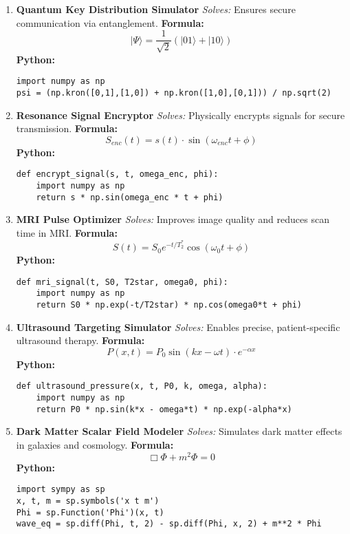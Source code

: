 \documentclass[12pt]{article}
\begin{document}
\begin{enumerate}[leftmargin=0pt, label=\textbf{\arabic*.}, itemsep=3em]
\item \textbf{Quantum Key Distribution Simulator}  
\textit{Solves:} Ensures secure communication via entanglement.  
\textbf{Formula:}  
\[
|\Psi\rangle = \frac{1}{\sqrt{2}}(|01\rangle + |10\rangle)
\]  
\textbf{Python:}
\begin{lstlisting}
import numpy as np
psi = (np.kron([0,1],[1,0]) + np.kron([1,0],[0,1])) / np.sqrt(2)
\end{lstlisting}

\item \textbf{Resonance Signal Encryptor}  
\textit{Solves:} Physically encrypts signals for secure transmission.  
\textbf{Formula:}  
\[
S_{enc}(t) = s(t) \cdot \sin(\omega_{enc} t + \phi)
\]  
\textbf{Python:}
\begin{lstlisting}
def encrypt_signal(s, t, omega_enc, phi):
    import numpy as np
    return s * np.sin(omega_enc * t + phi)
\end{lstlisting}

\item \textbf{MRI Pulse Optimizer}  
\textit{Solves:} Improves image quality and reduces scan time in MRI.  
\textbf{Formula:}  
\[
S(t) = S_0 e^{-t/T_2^*} \cos(\omega_0 t + \phi)
\]  
\textbf{Python:}
\begin{lstlisting}
def mri_signal(t, S0, T2star, omega0, phi):
    import numpy as np
    return S0 * np.exp(-t/T2star) * np.cos(omega0*t + phi)
\end{lstlisting}

\item \textbf{Ultrasound Targeting Simulator}  
\textit{Solves:} Enables precise, patient-specific ultrasound therapy.  
\textbf{Formula:}  
\[
P(x, t) = P_0 \sin(kx - \omega t) \cdot e^{-\alpha x}
\]  
\textbf{Python:}
\begin{lstlisting}
def ultrasound_pressure(x, t, P0, k, omega, alpha):
    import numpy as np
    return P0 * np.sin(k*x - omega*t) * np.exp(-alpha*x)
\end{lstlisting}

\item \textbf{Dark Matter Scalar Field Modeler}  
\textit{Solves:} Simulates dark matter effects in galaxies and cosmology.  
\textbf{Formula:}  
\[
\Box \Phi + m^2 \Phi = 0
\]  
\textbf{Python:}
\begin{lstlisting}
import sympy as sp
x, t, m = sp.symbols('x t m')
Phi = sp.Function('Phi')(x, t)
wave_eq = sp.diff(Phi, t, 2) - sp.diff(Phi, x, 2) + m**2 * Phi
\end{lstlisting}


\end{enumerate}
\end{document}
